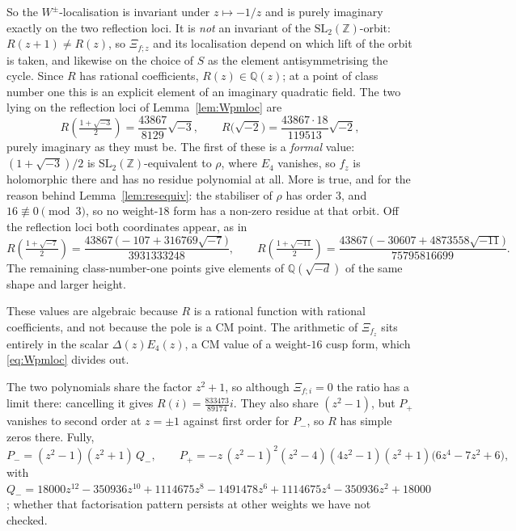 \documentclass[11pt]{article}
\newcommand{\ZZ}{\mathbb{Z}}
\newcommand{\QQ}{\mathbb{Q}}
\newcommand{\SLZ}{\mathrm{SL}_2(\ZZ)}
\begin{document}
So the $W^\pm$-localisation is invariant under $z\mapsto-1/z$ and is purely imaginary exactly on the
two reflection loci. It is \emph{not} an invariant of the $\SLZ$-orbit: $R(z+1)\neq R(z)$, so
$\Xi_{f;z}$ and its localisation depend on which lift of the orbit is taken, and likewise on the
choice of $S$ as the element antisymmetrising the cycle. Since $R$ has rational coefficients,
$R(z)\in\QQ(z)$; at a point of class number one this is an explicit element of an imaginary
quadratic field. The two lying on the reflection loci of Lemma~\ref{lem:Wpmloc} are
\begin{equation}\label{eq:Rheeg}
R\!\left(\tfrac{1+\sqrt{-3}}{2}\right)=\frac{43867}{8129}\sqrt{-3},
\qquad
R\big(\sqrt{-2}\big)=\frac{43867\cdot18}{119513}\sqrt{-2},
\end{equation}
purely imaginary as they must be. The first of these is a \emph{formal} value: $(1+\sqrt{-3})/2$ is
$\SLZ$-equivalent to $\rho$, where $E_4$ vanishes, so $f_z$ is holomorphic there and has no residue
polynomial at all. More is true, and for the reason behind Lemma~\ref{lem:resequiv}: the stabiliser
of $\rho$ has order $3$, and $16\not\equiv0\pmod 3$, so no weight-$18$ form has a non-zero residue
at that orbit. Off the reflection loci both coordinates appear, as in
\begin{equation}\label{eq:Rheeg7}
R\!\left(\tfrac{1+\sqrt{-7}}{2}\right)
=\frac{43867\,\big({-}107+316769\sqrt{-7}\big)}{3931333248},
\qquad
R\!\left(\tfrac{1+\sqrt{-11}}{2}\right)
=\frac{43867\,\big({-}30607+4873558\sqrt{-11}\big)}{75795816699}.
\end{equation}
The remaining class-number-one points give elements of $\QQ(\sqrt{-d})$ of the same shape and
larger height.

These values are algebraic because $R$ is a rational function with rational coefficients, and not
because the pole is a CM point. The arithmetic of $\Xi_{f_z}$ sits entirely in the scalar
$\Delta(z)E_4(z)$, a CM value of a weight-$16$ cusp form, which \eqref{eq:Wpmloc} divides out.

The two polynomials share the factor $z^2+1$, so although $\Xi_{f;i}=0$ the ratio has a limit
there: cancelling it gives $R(i)=\tfrac{833473}{89174}i$. They also share $(z^2-1)$, but $P_+$
vanishes to second order at $z=\pm1$ against first order for $P_-$, so $R$ has simple zeros there.
Fully,
\begin{equation}\label{eq:Pfac}
P_-=(z^2-1)(z^2+1)\,Q_-,\qquad
P_+=-z\,(z^2-1)^2(z^2-4)(4z^2-1)(z^2+1)\big(6z^4-7z^2+6\big),
\end{equation}
with $Q_-=18000z^{12}-350936z^{10}+1114675z^{8}-1491478z^{6}+1114675z^{4}-350936z^{2}+18000$;
whether that factorisation pattern persists at other weights we have not checked.
\end{document}
